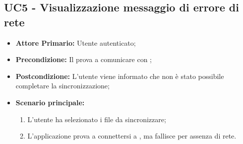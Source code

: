 \subsection{UC5 - Visualizzazione messaggio di errore di rete}
\label{UC5}
\begin{itemize}
\item \textbf{Attore Primario:} Utente autenticato;
\item \textbf{Precondizione:} Il  prova a comunicare con ;
\item \textbf{Postcondizione:} L'utente viene informato che non è stato possibile completare la sincronizzazione;
\item \textbf{Scenario principale:}
    \begin{enumerate}
    \item L'utente ha selezionato i file da sincronizzare;
    \item L'applicazione prova a connettersi a , ma fallisce per assenza di rete.
    \end{enumerate}
\end{itemize}